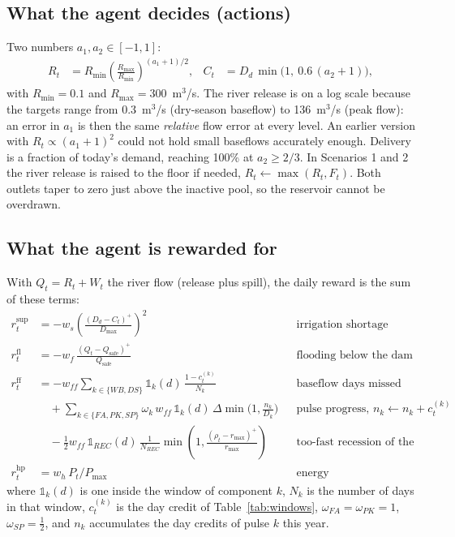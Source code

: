 \documentclass[11pt]{article}
\newcommand{\Qsafe}{Q_{\mathrm{safe}}}
\begin{document}
\subsection{What the agent decides (actions)}
Two numbers $a_1,a_2\in[-1,1]$:
\begin{align}
R_t &= R_{\min}\left(\frac{R_{\max}}{R_{\min}}\right)^{(a_1+1)/2} , &
C_t &= D_d\,\min\!\big(1,\ 0.6\,(a_2+1)\big),
\end{align}
with $R_{\min}=0.1$ and $R_{\max}=300$~m$^3$/s. The river release is on a
log scale because the targets range from 0.3~m$^3$/s (dry-season baseflow)
to 136~m$^3$/s (peak flow): an error in $a_1$ is then the same
\emph{relative} flow error at every level. An earlier version with
$R_t\propto(a_1+1)^2$ could not hold small baseflows accurately enough. Delivery is a fraction of today's
demand, reaching 100\% at $a_2\ge 2/3$. In Scenarios 1 and 2 the river
release is raised to the floor if needed, $R_t\leftarrow\max(R_t, F_t)$.
Both outlets taper to zero just above the inactive pool, so the reservoir
cannot be overdrawn.

\subsection{What the agent is rewarded for}
\label{sec:reward}
With $Q_t=R_t+W_t$ the river flow (release plus spill), the daily reward is
the sum of these terms:
\begin{align}
r^{\mathrm{sup}}_t &= -w_s\left(\frac{(D_d-C_t)^+}{D_{\max}}\right)^2
  &&\text{irrigation shortage (squared)}\\
r^{\mathrm{fl}}_t &= -w_f\,\frac{(Q_t-\Qsafe)^+}{\Qsafe}
  &&\text{flooding below the dam}\\
r^{\mathrm{ff}}_t &= -w_{\mathit{ff}}\sum_{k\in\{WB,DS\}}\mathbb{1}_k(d)\,\frac{1-c_t^{(k)}}{N_k}
  && \text{baseflow days missed}\nonumber\\
  &\quad+ \sum_{k\in\{FA,PK,SP\}} \omega_k\,w_{\mathit{ff}}\,\mathbb{1}_k(d)\,\Delta\!\min\!\Big(1,\frac{n_k}{D_k}\Big)
  && \text{pulse progress, } n_k\leftarrow n_k+c_t^{(k)}\nonumber\\
  &\quad- \tfrac12 w_{\mathit{ff}}\,\mathbb{1}_{REC}(d)\,\frac{1}{N_{REC}}\min\!\left(1,\frac{(\rho_t-r_{\max})^+}{r_{\max}}\right)
  && \text{too-fast recession of the 7-day mean}\\
r^{\mathrm{hp}}_t &= w_h\,P_t/P_{\max} &&\text{energy}
\end{align}
where $\mathbb{1}_k(d)$ is one inside the window of component $k$, $N_k$ is
the number of days in that window, $c_t^{(k)}$ is the day credit of
Table~\ref{tab:windows}, $\omega_{FA}=\omega_{PK}=1$, $\omega_{SP}=\tfrac12$,
and $n_k$ accumulates the day credits of pulse $k$ this year.
\end{document}
